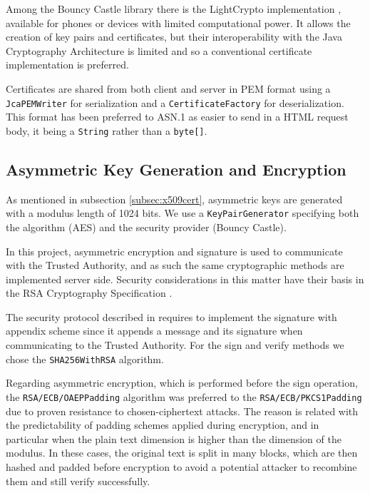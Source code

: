Among the Bouncy Castle library there is the LightCrypto implementation \cite{LightCrypto}, available for phones or devices with limited computational power. It allows the creation of key pairs and certificates, but their interoperability with the Java Cryptography Architecture is limited and so a conventional certificate implementation is preferred. 

Certificates are shared from both client and server in PEM format using a \texttt{JcaPEMWriter} for serialization and a \texttt{CertificateFactory} for deserialization. This format has been preferred to ASN.1 as easier to send in a HTML request body, it being a \texttt{String} rather than a \texttt{byte[]}.

\subsection{Asymmetric Key Generation and Encryption}
As mentioned in subsection \ref{subsec:x509cert}, asymmetric keys are generated with a modulus length of 1024 bits. We use a \texttt{KeyPairGenerator} specifying both the algorithm (AES) and the security provider (Bouncy Castle).



In this project, asymmetric encryption and signature is used to communicate with the Trusted Authority, and as such the same cryptographic methods are implemented server side. Security considerations in this matter have their basis in the RSA Cryptography Specification \cite{rfc8017}.

The security protocol described in \cite{pearson2011sticky} requires to implement the signature with appendix scheme since it appends a message and its signature when communicating to the Trusted Authority. For the sign and verify methods we chose the \texttt{SHA256WithRSA} algorithm. 

Regarding asymmetric encryption, which is performed before the sign operation, the \texttt{RSA/ECB/OAEPPadding} algorithm was preferred to the \texttt{RSA/ECB/PKCS1Padding} due to proven resistance to chosen-ciphertext attacks. The reason is related with the predictability of padding schemes applied during encryption, and in particular when the plain text dimension is higher than the dimension of the modulus. In these cases, the original text is split in many blocks, which are then hashed and padded before encryption to avoid a potential attacker to recombine them and still verify successfully.

